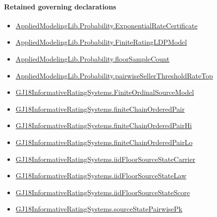 \documentclass[10pt]{article}
\begin{document}
\paragraph{Retained governing declarations}
\begin{itemize}\raggedright
\item \hyperlink{governing-declaration-330a08568e50e95e}{Applied\allowbreak{}Modeling\allowbreak{}Lib.\allowbreak{}Probability.\allowbreak{}Exponential\allowbreak{}Rate\allowbreak{}Certificate}
\item \hyperlink{governing-declaration-765e92a42a7a9947}{Applied\allowbreak{}Modeling\allowbreak{}Lib.\allowbreak{}Probability.\allowbreak{}Finite\allowbreak{}Rating\allowbreak{}LDP\allowbreak{}Model}
\item \hyperlink{library-prerequisite-b01059f5e405e09c}{Applied\allowbreak{}Modeling\allowbreak{}Lib.\allowbreak{}Probability.\allowbreak{}floor\allowbreak{}Sample\allowbreak{}Count}
\item \hyperlink{governing-declaration-f71e26890ae5348a}{Applied\allowbreak{}Modeling\allowbreak{}Lib.\allowbreak{}Probability.\allowbreak{}pairwise\allowbreak{}Seller\allowbreak{}Threshold\allowbreak{}Rate\allowbreak{}Top}
\item \hyperlink{governing-declaration-9d70577d8e1f92b4}{GJ18\allowbreak{}Informative\allowbreak{}Rating\allowbreak{}Systems.\allowbreak{}Finite\allowbreak{}Ordinal\allowbreak{}Source\allowbreak{}Model}
\item \hyperlink{governing-declaration-490763321205956c}{GJ18\allowbreak{}Informative\allowbreak{}Rating\allowbreak{}Systems.\allowbreak{}finite\allowbreak{}Chain\allowbreak{}Ordered\allowbreak{}Pair}
\item \hyperlink{governing-declaration-715e676f85beb410}{GJ18\allowbreak{}Informative\allowbreak{}Rating\allowbreak{}Systems.\allowbreak{}finite\allowbreak{}Chain\allowbreak{}Ordered\allowbreak{}Pair\allowbreak{}Hi}
\item \hyperlink{governing-declaration-6d4a53d73be0eb55}{GJ18\allowbreak{}Informative\allowbreak{}Rating\allowbreak{}Systems.\allowbreak{}finite\allowbreak{}Chain\allowbreak{}Ordered\allowbreak{}Pair\allowbreak{}Lo}
\item \hyperlink{governing-declaration-70ff3320c885dbc0}{GJ18\allowbreak{}Informative\allowbreak{}Rating\allowbreak{}Systems.\allowbreak{}iid\allowbreak{}Floor\allowbreak{}Source\allowbreak{}State\allowbreak{}Carrier}
\item \hyperlink{governing-declaration-d95c2e3ca64a056a}{GJ18\allowbreak{}Informative\allowbreak{}Rating\allowbreak{}Systems.\allowbreak{}iid\allowbreak{}Floor\allowbreak{}Source\allowbreak{}State\allowbreak{}Law}
\item \hyperlink{governing-declaration-a4b741138dce5934}{GJ18\allowbreak{}Informative\allowbreak{}Rating\allowbreak{}Systems.\allowbreak{}iid\allowbreak{}Floor\allowbreak{}Source\allowbreak{}State\allowbreak{}Score}
\item \hyperlink{paper-prerequisite-e2953365ffe4a1ff}{GJ18\allowbreak{}Informative\allowbreak{}Rating\allowbreak{}Systems.\allowbreak{}source\allowbreak{}State\allowbreak{}Pairwise\allowbreak{}Pk}
\end{itemize}
\end{document}
